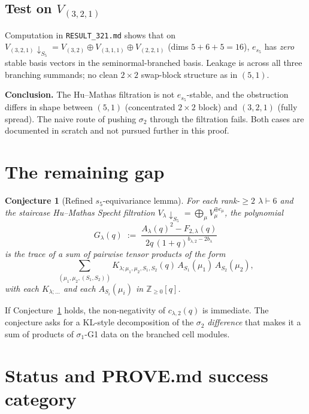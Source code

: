 \documentclass{article}
\newtheorem{conjecture}[theorem]{Conjecture}
\theoremstyle{definition}
\begin{document}
\subsection{Test on $V_{(3,2,1)}$}

Computation in \verb|RESULT_321.md| shows that on $V_{(3,2,1)}\downarrow_{S_5} = V_{(3,2)}\oplus V_{(3,1,1)}\oplus V_{(2,2,1)}$ (dims $5+6+5 = 16$),
$e_{s_5}$ has \emph{zero} stable basis vectors in the seminormal-branched basis.
Leakage is across all three branching summands; no clean $2\times 2$ swap-block
structure as in $(5,1)$.

\textbf{Conclusion.} The Hu--Mathas filtration is not $e_{s_5}$-stable, and
the obstruction differs in shape between $(5,1)$ (concentrated $2\times 2$ block) and
$(3,2,1)$ (fully spread). The naive route of pushing $\sigma_2$ through the
filtration fails. Both cases are documented in scratch and not pursued further
in this proof.

\section{The remaining gap}

\begin{conjecture}[Refined $s_5$-equivariance lemma]\label{conj:gap}
For each rank-$\geq 2$ $\lambda \vdash 6$ and the staircase Hu--Mathas Specht
filtration $V_\lambda \downarrow_{S_5} = \bigoplus_\mu V_\mu^{\oplus c_\mu}$,
the polynomial
\[
  G_\lambda(q) \;:=\; \frac{A_\lambda(q)^2 - F_{2,\lambda}(q)}{2q\,(1+q)^{b_{\lambda,2}-2b_\lambda}}
\]
is the trace of a sum of pairwise tensor products of the form
\[
  \sum_{(\mu_1,\mu_2,(S_1,S_2))} K_{\lambda;\mu_1,\mu_2,S_1,S_2}(q)\, A_{S_1}(\mu_1)\,A_{S_2}(\mu_2),
\]
with each $K_{\lambda;\dots}$ and each $A_{S_i}(\mu_i)$ in $\mathbb{Z}_{\geq 0}[q]$.
\end{conjecture}

If Conjecture~\ref{conj:gap} holds, the non-negativity of $c_{\lambda,2}(q)$
is immediate. The conjecture asks for a KL-style decomposition of the
$\sigma_2$ \emph{difference} that makes it a sum of products of $\sigma_1$-G1
data on the branched cell modules.

\section{Status and PROVE.md success category}
\end{document}
